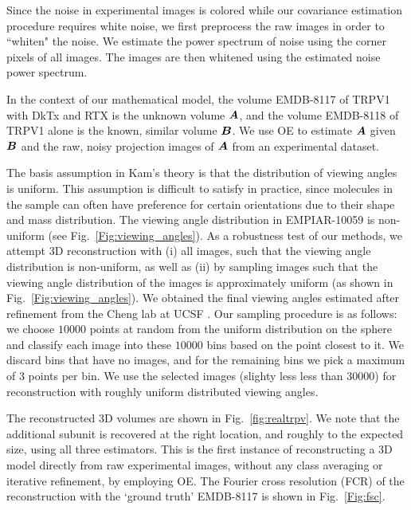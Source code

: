 Since the noise in experimental images is colored while our covariance estimation procedure requires white noise, we first preprocess the raw images in order to ``whiten" 
the noise. We estimate the power spectrum of noise using the corner pixels of 
all images. The images are then whitened using the estimated noise power 
spectrum.

In the context of our mathematical model, the volume EMDB-8117 of TRPV1 with DkTx 
and RTX is the unknown volume $\boldsymbol{A}$, and the volume EMDB-8118 of TRPV1 
alone is the known, similar volume $\boldsymbol{B}$. We use OE to estimate $\boldsymbol{A}$ 
given $\boldsymbol{B}$ and the raw, noisy projection images of $\boldsymbol{A}$ from an 
experimental dataset. 

The basis assumption in Kam's theory is that the distribution of viewing angles is uniform. This assumption is difficult to satisfy in
practice, since molecules in the sample can often have preference for certain orientations
due to their shape and mass distribution. The viewing angle distribution in EMPIAR-10059
is non-uniform (see Fig.~\ref{Fig:viewing_angles}). As a robustness test of our methods, we attempt
3D reconstruction with (i) all images, such that the viewing angle distribution is non-uniform, as
well as (ii) by sampling images such that the viewing angle distribution of the images is 
approximately uniform (as shown in Fig.~\ref{Fig:viewing_angles}). We obtained the
final viewing angles estimated after refinement from the Cheng lab at UCSF \cite{gao16}. Our
sampling procedure is as follows: we choose $10000$ points at random from the uniform distribution on the sphere and classify each image into
these $10000$ bins based on the point closest to it. We discard bins that have no images, and for the remaining
bins we pick a maximum of $3$ points per bin. We use the selected images (slighty less less than $30000$) for reconstruction with
roughly uniform distributed viewing angles.

The reconstructed 3D volumes are 
shown in Fig.~\ref{fig:realtrpv}. We note that the additional subunit is 
recovered at the right location, and roughly to the expected size, 
using all three estimators. This is the first instance of reconstructing a 3D 
model directly from raw experimental images, without any class
averaging or iterative refinement, by employing OE. The Fourier cross resolution (FCR) of the reconstruction with the `ground truth' EMDB-8117 is shown in Fig.~\ref{Fig:fsc}.

